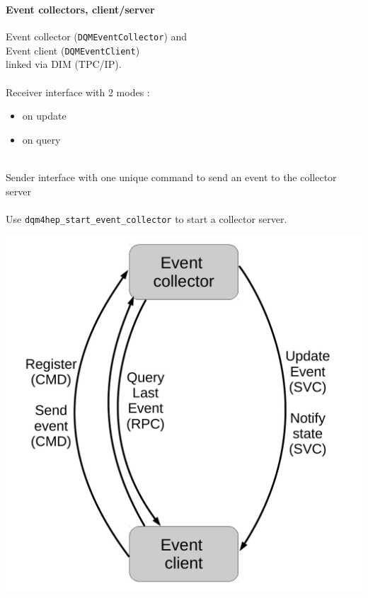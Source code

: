 \documentclass[8pt]{beamer}
\begin{document}
  \begin{frame}[containsverbatim]
    \frametitle{\secname}
    \framesubtitle{Event collectors, client/server}
    
    \begin{minipage}{0.52\textwidth}
        Event collector (\verb|DQMEventCollector|) and \\
        Event client (\verb|DQMEventClient|) \\
        linked via DIM (TPC/IP).\\
        ~ \\
        Receiver interface with 2 modes :
        \begin{itemize}
          \item on update
          \item on query
        \end{itemize}
        ~ \\
        Sender interface with one unique command to send an event to the collector server \\
        ~ \\
        Use \verb|dqm4hep_start_event_collector| to start a collector server.
    \end{minipage}
    \begin{minipage}{0.42\textwidth}
      \begin{center}
        \includegraphics[width=\textwidth]{figs/event_collector_arch.pdf}        
      \end{center}      
    \end{minipage}
        
  \end{frame}
\end{document}
